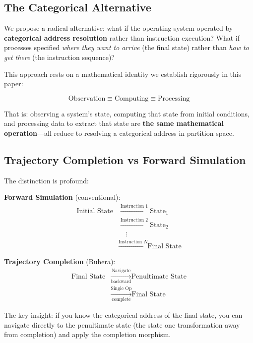 \documentclass[twocolumn,10pt]{article}
\theoremstyle{definition}
\theoremstyle{remark}
\begin{document}
\subsection{The Categorical Alternative}

We propose a radical alternative: what if the operating system operated by \textbf{categorical address resolution} rather than instruction execution? What if processes specified \emph{where they want to arrive} (the final state) rather than \emph{how to get there} (the instruction sequence)?

This approach rests on a mathematical identity we establish rigorously in this paper:

\begin{equation}
\boxed{\text{Observation} \equiv \text{Computing} \equiv \text{Processing}}
\label{eq:fundamental_identity}
\end{equation}

That is: observing a system's state, computing that state from initial conditions, and processing data to extract that state are \textbf{the same mathematical operation}—all reduce to resolving a categorical address in partition space.

\subsection{Trajectory Completion vs Forward Simulation}

The distinction is profound:

\textbf{Forward Simulation} (conventional):
\begin{align}
    \text{Initial State} &\xrightarrow{\text{Instruction 1}} \text{State}_1 \nonumber \\
    &\xrightarrow{\text{Instruction 2}} \text{State}_2 \nonumber \\
    &\quad \vdots \nonumber \\
    &\xrightarrow{\text{Instruction } N} \text{Final State}
\end{align}

\textbf{Trajectory Completion} (Buhera):
\begin{align}
    \text{Final State} &\xrightarrow[\text{backward}]{\text{Navigate}} \text{Penultimate State} \nonumber \\
    &\xrightarrow[\text{complete}]{\text{Single Op}} \text{Final State}
\end{align}

The key insight: if you know the categorical address of the final state, you can navigate directly to the penultimate state (the state one transformation away from completion) and apply the completion morphism.
\end{document}
